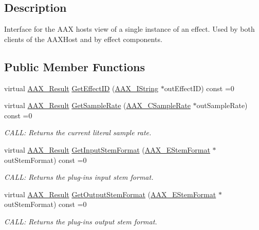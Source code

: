 \subsection{Description}
Interface for the A\+A\+X host\textquotesingle{}s view of a single instance of an effect. Used by both clients of the A\+A\+X\+Host and by effect components. \subsection*{Public Member Functions}
\begin{DoxyCompactItemize}
\item 
virtual \hyperlink{a00149_a4d8f69a697df7f70c3a8e9b8ee130d2f}{A\+A\+X\+\_\+\+Result} \hyperlink{a00053_ae1ccab17cf8b38ab415a7f097cb7d683}{Get\+Effect\+I\+D} (\hyperlink{a00113}{A\+A\+X\+\_\+\+I\+String} $\ast$out\+Effect\+I\+D) const =0
\item 
virtual \hyperlink{a00149_a4d8f69a697df7f70c3a8e9b8ee130d2f}{A\+A\+X\+\_\+\+Result} \hyperlink{a00053_a434883281a90e7bfa7cfe20d941bfa9a}{Get\+Sample\+Rate} (\hyperlink{a00149_a3d9eea08f47e0b0a23432e15baa4e885}{A\+A\+X\+\_\+\+C\+Sample\+Rate} $\ast$out\+Sample\+Rate) const =0
\begin{DoxyCompactList}\small\item\em C\+A\+L\+L\+: Returns the current literal sample rate. \end{DoxyCompactList}\item 
virtual \hyperlink{a00149_a4d8f69a697df7f70c3a8e9b8ee130d2f}{A\+A\+X\+\_\+\+Result} \hyperlink{a00053_ae2bdea915b0d7165afd000deb9d4defc}{Get\+Input\+Stem\+Format} (\hyperlink{a00206_ad8af5ef008b2bd478add9a0acb0a1d85}{A\+A\+X\+\_\+\+E\+Stem\+Format} $\ast$out\+Stem\+Format) const =0
\begin{DoxyCompactList}\small\item\em C\+A\+L\+L\+: Returns the plug-\/in\textquotesingle{}s input stem format. \end{DoxyCompactList}\item 
virtual \hyperlink{a00149_a4d8f69a697df7f70c3a8e9b8ee130d2f}{A\+A\+X\+\_\+\+Result} \hyperlink{a00053_a7d2a011577cf27d9e79f7537aa279bcb}{Get\+Output\+Stem\+Format} (\hyperlink{a00206_ad8af5ef008b2bd478add9a0acb0a1d85}{A\+A\+X\+\_\+\+E\+Stem\+Format} $\ast$out\+Stem\+Format) const =0
\begin{DoxyCompactList}\small\item\em C\+A\+L\+L\+: Returns the plug-\/in\textquotesingle{}s output stem format. \end{DoxyCompactList}\item 

\end{DoxyCompactItemize}
